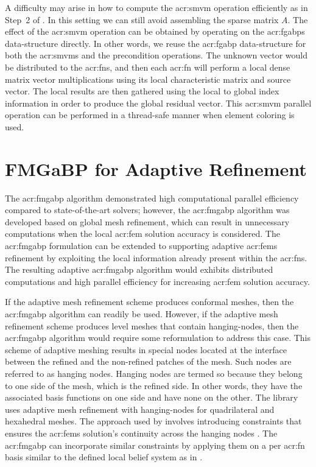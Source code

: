 A difficulty may arise in how to compute the \gls{acr:smvm} operation efficiently as in Step~2 of .
In this setting we can still avoid assembling the sparse matrix $A$.
The effect of the \gls{acr:smvm} operation can be obtained by operating on the \glspl{acr:fgabp} data-structure directly.
In other words, we reuse the \gls{acr:fgabp} data-structure for both the \glspl{acr:smvm} and the precondition operations.
The unknown vector would be distributed to the \glspl{acr:fn}, and then each \gls{acr:fn} will perform a local dense matrix vector multiplications using its local characteristic matrix and source vector.
The local results are then gathered using the local to global index information in order to produce the global residual vector.
This \gls{acr:smvm} parallel operation can be performed in a thread-safe manner when element coloring is used.

\section{FMGaBP for Adaptive Refinement}

The \gls{acr:fmgabp} algorithm demonstrated high computational parallel efficiency compared to state-of-the-art solvers; however, the \gls{acr:fmgabp} algorithm was developed based on global mesh refinement, which can result in unnecessary computations when the local \gls{acr:fem} solution accuracy is considered.
The \gls{acr:fmgabp} formulation can be extended to supporting adaptive \glspl{acr:fem} refinement by exploiting the local information already present within the \glspl{acr:fn}.
The resulting adaptive \gls{acr:fmgabp} algorithm would exhibits distributed computations and high parallel efficiency for increasing \gls{acr:fem} solution accuracy.


If the adaptive mesh refinement scheme produces conformal meshes, then the \gls{acr:fmgabp} algorithm can readily be used.
However, if the adaptive mesh refinement scheme produces level meshes that contain hanging-nodes, then the \gls{acr:fmgabp} algorithm would require some reformulation to address this case.
This scheme of adaptive meshing results in special nodes located at the interface between the refined and the non-refined patches of the mesh.
Such nodes are referred to as hanging nodes.
Hanging nodes are termed so because they belong to one side of the mesh, which is the refined side.
In other words, they have the associated basis functions on one side and have none on the other.
The library  uses adaptive mesh refinement with hanging-nodes for quadrilateral and hexahedral meshes.
The approach used by  involves introducing constraints that ensures the \glspl{acr:fem} solution's continuity across the hanging nodes \cite{bib:janssen2011adaptive}. 
The \gls{acr:fmgabp} can incorporate similar constraints by applying them on a per \gls{acr:fn} basis similar to the defined local belief system as in .


